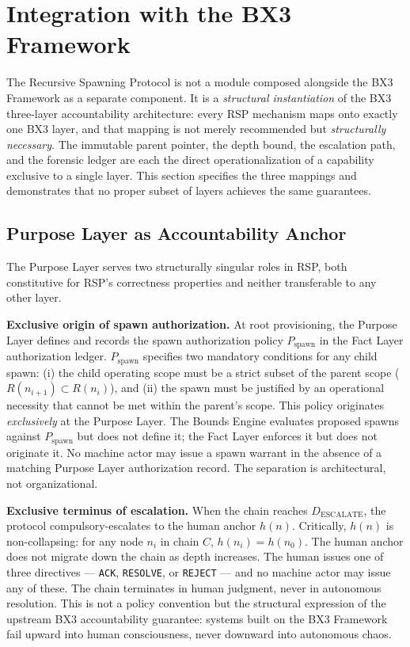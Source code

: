 \section{Integration with the BX3 Framework}
\label{sec:rs-integration}

The Recursive Spawning Protocol is not a module composed alongside the BX3 Framework as a separate component. It is a \emph{structural instantiation} of the BX3 three-layer accountability architecture: every RSP mechanism maps onto exactly one BX3 layer, and that mapping is not merely recommended but \emph{structurally necessary}. The immutable parent pointer, the depth bound, the escalation path, and the forensic ledger are each the direct operationalization of a capability exclusive to a single layer. This section specifies the three mappings and demonstrates that no proper subset of layers achieves the same guarantees.

\subsection{Purpose Layer as Accountability Anchor}
\label{sec:rs-purpose-anchor}

The Purpose Layer serves two structurally singular roles in RSP, both constitutive for RSP's correctness properties and neither transferable to any other layer.

\medskip
\noindent\textbf{Exclusive origin of spawn authorization.} At root provisioning, the Purpose Layer defines and records the spawn authorization policy $P_{\mathrm{spawn}}$ in the Fact Layer authorization ledger. $P_{\mathrm{spawn}}$ specifies two mandatory conditions for any child spawn: (i) the child operating scope must be a strict subset of the parent scope ($R(n_{i+1}) \subset R(n_i)$), and (ii) the spawn must be justified by an operational necessity that cannot be met within the parent's scope. This policy originates \emph{exclusively} at the Purpose Layer. The Bounds Engine evaluates proposed spawns against $P_{\mathrm{spawn}}$ but does not define it; the Fact Layer enforces it but does not originate it. No machine actor may issue a spawn warrant in the absence of a matching Purpose Layer authorization record. The separation is architectural, not organizational.

\medskip
\noindent\textbf{Exclusive terminus of escalation.} When the chain reaches $D_{\mathrm{ESCALATE}}$, the protocol compulsory-escalates to the human anchor $h(n)$. Critically, $h(n)$ is non-collapsing: for any node $n_i$ in chain $C$, $h(n_i) = h(n_0)$. The human anchor does not migrate down the chain as depth increases. The human issues one of three directives --- \texttt{ACK}, \texttt{RESOLVE}, or \texttt{REJECT} --- and no machine actor may issue any of these. The chain terminates in human judgment, never in autonomous resolution. This is not a policy convention but the structural expression of the upstream BX3 accountability guarantee: systems built on the BX3 Framework fail upward into human consciousness, never downward into autonomous chaos.

